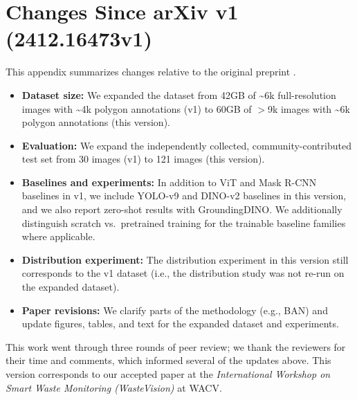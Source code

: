 \section{Changes Since arXiv v1 (2412.16473v1)}
\label{sec:changes-since-v1}

This appendix summarizes changes relative to the original preprint
.

\begin{itemize}
    \setlength{\itemsep}{0pt}
    \setlength{\parskip}{0pt}
    \setlength{\parsep}{0pt}

    \item \textbf{Dataset size:} We expanded the dataset from 42GB of \textasciitilde6k full-resolution images with \textasciitilde4k polygon annotations (v1) to 60GB of $>$9k images with \textasciitilde6k polygon annotations (this version).

    \item \textbf{Evaluation:} We expand the independently collected, community-contributed test set from 30 images (v1) to 121 images (this version).

    \item \textbf{Baselines and experiments:} In addition to ViT and Mask R-CNN baselines in v1, we include YOLO-v9 and DINO-v2 baselines in this version, and we also report zero-shot results with GroundingDINO. We additionally distinguish scratch vs.\ pretrained training for the trainable baseline families where applicable.

    \item \textbf{Distribution experiment:} The distribution experiment in this version still corresponds to the v1 dataset (i.e., the distribution study was not re-run on the expanded dataset).

    \item \textbf{Paper revisions:} We clarify parts of the methodology (e.g., BAN) and update figures, tables, and text for the expanded dataset and experiments.

\end{itemize}

This work went through three rounds of peer review; we thank the reviewers for
their time and comments, which informed several of the updates above.  This
version corresponds to our accepted paper at the \emph{International Workshop
on Smart Waste Monitoring (WasteVision)} at WACV.
